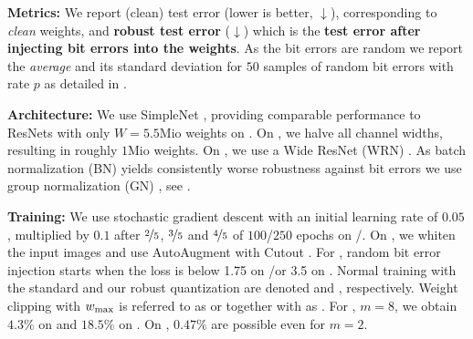 \textbf{Metrics:} We report (clean) test error \TE (lower is better, $\downarrow$), corresponding to \emph{clean} weights, and \textbf{robust test error \RTE} ($\downarrow$) which is the 
\textbf{test error after injecting bit errors into the weights}. As the
bit errors are random we report the \emph{average} \RTE and its standard deviation for $50$ samples of random bit errors with rate $p$ as detailed in .

\textbf{Architecture:} We use SimpleNet \citep{HasanpourARXIV2016}, providing comparable performance to ResNets \cite{HeCVPR2016} with only $W{=}5.5\text{Mio}$ weights on \CifarT. On \MNIST, we halve all channel widths, resulting in roughly $1\text{Mio}$ weights. On \CifarH, we use a Wide ResNet (WRN) \cite{ZagoruykoBMVC2016}. As batch normalization (BN) \cite{IoffeICML2015} yields
consistently worse robustness against bit errors we use group normalization (GN) \cite{WuECCV2018}, see 
.

\textbf{Training:} We use stochastic gradient descent with an initial learning rate of $0.05$, multiplied by $0.1$ after $\nicefrac{2}{5}$, $\nicefrac{3}{5}$ and $\nicefrac{4}{5}$ of $100$/$250$ epochs on \MNIST/\Cifar. On \Cifar, we whiten the input images and use AutoAugment \cite{CubukARXIV2018} with Cutout \cite{DevriesARXIV2017}. For \Random, random bit error injection starts when the loss is below 1.75 on \MNIST/\CifarT or 3.5 on \CifarH. Normal training with the standard and our robust quantization are denoted \Normal and \Quant, respectively. Weight clipping with $\wmax$ is referred to as \Clipping[\wmax] or together with \Random as \Random[\wmax]. 
For \Quant, $m = 8$, we obtain $4.3\%$ on \CifarT and $18.5\%$ \TE on \CifarH. On \MNIST, $0.47\%$ are possible even for $m = 2$. 

